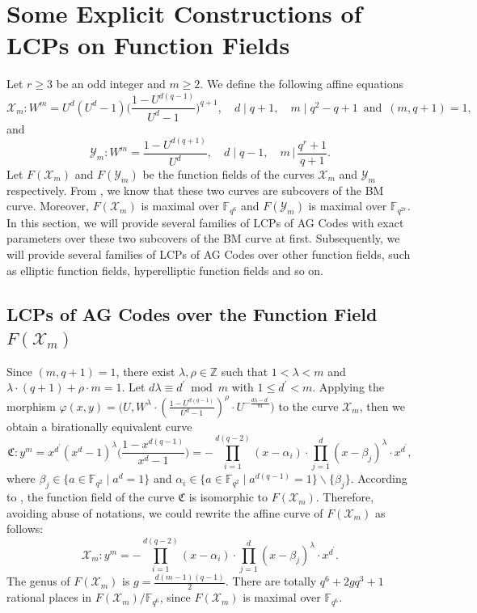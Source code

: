\documentclass[journal,12pt,onecolumn]{IEEEtran}
\begin{document}
\section{Some Explicit Constructions of LCPs on Function Fields}\label{LCPs_of_AG Codes}

Let $r\ge3$ be an odd integer and $m\ge2$. We define the following affine equations
\[
    \mathcal{X}_m : W^m = U^d(U^d-1)\bigg( \frac{1-U^{d(q-1)}}{U^d-1} \bigg)^{q+1},\quad d\mid q+1,\quad m\mid q^2-q+1\,\text{ and }\,(m,q+1)=1,
\]
and 
\[
    \mathcal{Y}_m : W^m = \frac{1-U^{d(q+1)}}{U^d},\quad d\mid q-1,\quad m\,\bigg|\,\frac{q^r+1}{q+1}. 
\]
Let $F(\mathcal{X}_m)$ and $F(\mathcal{Y}_m)$ be the function fields of the curves $\mathcal{X}_m$ and $\mathcal{Y}_m$ respectively. From \cite{mendozaExplicitEquationsMaximal2022}, we know that these two curves are subcovers of the BM curve. Moreover, $F(\mathcal{X}_m)$ is maximal over $\mathbb{F}_{q^6}$ and $F(\mathcal{Y}_m)$ is maximal over $\mathbb{F}_{q^{2r}}$. In this section, we will provide several families of LCPs of AG Codes with exact parameters over these two subcovers of the BM curve at first. Subsequently, we will provide several families of LCPs of AG Codes over other function fields, such as elliptic function fields, hyperelliptic function fields and so on. 



\subsection{LCPs of AG Codes over the Function Field $F(\mathcal{X}_m)$} 

Since $(m,q+1)=1$, there exist $\lambda,\rho\in\mathbb{Z}$ such that $1< \lambda<m$ and $\lambda\cdot (q+1)+\rho \cdot m=1$. Let $d\lambda\equiv d^\prime \bmod m$ with $1\le d^\prime<m$. Applying the morphism $\varphi(x,y) = \big(U,W^\lambda\cdot( \frac{1-U^{d(q-1)}}{U^d-1} )^\rho\cdot U^{-\frac{d\lambda-d^\prime}{m}}\big)$ to the curve $\mathcal{X}_m$, then we obtain a birationally equivalent curve
\[
    \mathfrak{C}:y^m = x^{d^\prime}(x^d-1)^\lambda\bigg( \frac{1-x^{d(q-1)}}{x^d-1} \bigg) = - \prod_{i=1}^{d(q-2)}(x-\alpha_i)\cdot\prod_{j=1}^d(x-\beta_j)^\lambda\cdot x^{d^\prime}, 
\]
where $\beta_j\in \{ a\in\mathbb{F}_{q^2}\mid a^d = 1 \}$ and $\alpha_i\in\{ a\in\mathbb{F}_{q^2}\mid a^{d(q-1)} = 1 \}\backslash\{\beta_j\}$. According to \cite[Cor. 4.5]{Algebraic_Geometry}, the function field of the curve $\mathfrak{C}$ is isomorphic to $F(\mathcal{X}_m)$. Therefore, avoiding abuse of notations, we could rewrite the affine curve of $F(\mathcal{X}_m)$ as follows:
\[
    \mathcal{X}_m : y^m = - \prod_{i=1}^{d(q-2)}(x-\alpha_i)\cdot\prod_{j=1}^d(x-\beta_j)^\lambda\cdot x^{d^\prime}. 
\]
The genus of $F(\mathcal{X}_m)$ is $g=\frac{d(m-1)(q-1)}{2}$. There are totally $q^6+2gq^3+1$ rational places in $F(\mathcal{X}_m)/\mathbb{F}_{q^6}$, since $F(\mathcal{X}_m)$ is maximal over $\mathbb{F}_{q^6}$. 
\end{document}
